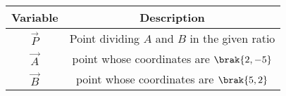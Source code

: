 \begin{tabular}[12pt]{ |c| c|}
    \hline
    \textbf{Variable} & \textbf{Description}\\ 
    \hline
    $\vec P$ & Point dividing $A$ and $B$ in the given ratio \\
    \hline 
    $\vec A$ & point whose coordinates are $\brak{2,-5}$\\
    \hline
    $\vec B$ & point whose coordinates are $\brak{5,2}$\\
    \hline   
    \end{tabular}
